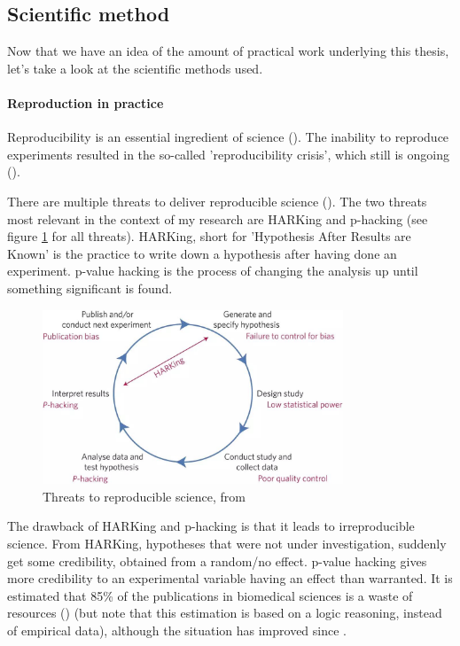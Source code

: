 \subsection{Scientific method}

Now that we have an idea of the amount of practical work underlying
this thesis, let's take a look at the scientific methods used.

\paragraph{Reproduction in practice}

Reproducibility is an essential ingredient of science (\cite{mcnutt2014reproducibility}).
The inability to reproduce experiments resulted in the so-called 'reproducibility
crisis', which still is ongoing (\cite{schooler2014metascience}).

There are multiple threats to deliver reproducible 
science (\cite{munafo2017manifesto}).
The two threats most relevant in the context
of my research are HARKing and p-hacking (see 
figure \ref{fig:manifesto} for all threats).
HARKing, short for 'Hypothesis After Results are Known' is the practice
to write down a hypothesis after having done an experiment.
p-value hacking is the process of changing the analysis up until
something significant is found. 

\begin{figure}[]
  \includegraphics[width=0.8\textwidth]{munafo2017manifesto_fig_1.jpg}
  \caption{
    Threats to reproducible science, from \cite{munafo2017manifesto}
  }
  \label{fig:manifesto}
\end{figure}

The drawback of HARKing and p-hacking is that it leads to
irreproducible science. From HARKing, hypotheses that were not under
investigation, suddenly get some credibility, obtained from a
random/no effect. p-value hacking gives more credibility 
to an experimental variable having an effect than warranted.
It is estimated that 85\% of the publications in biomedical sciences
is a waste of resources (\cite{chalmers2009avoidable}) (but note
that this estimation is based on a logic reasoning, instead
of empirical data), although the situation has improved 
since \citet{macleod2014biomedical}. 

